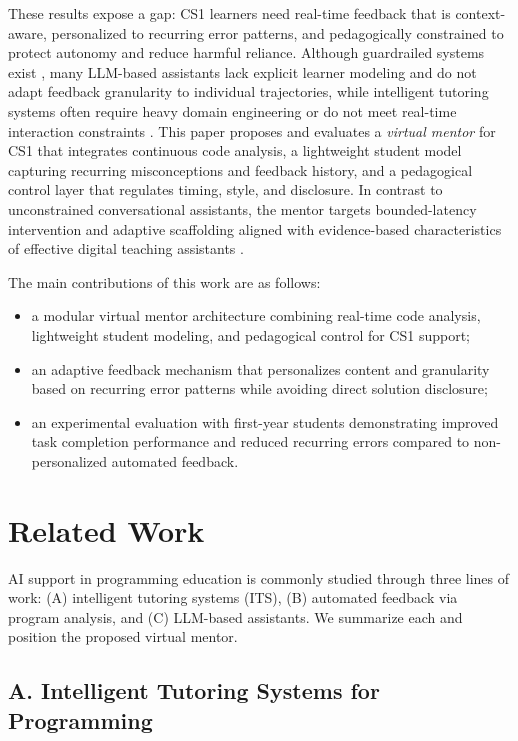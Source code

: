 \documentclass[conference]{IEEEtran}
\begin{document}
These results expose a gap: CS1 learners need real-time feedback that is context-aware, personalized to recurring error patterns, and pedagogically constrained to protect autonomy and reduce harmful reliance. Although guardrailed systems exist \cite{CodeAid,IRIS}, many LLM-based assistants lack explicit learner modeling and do not adapt feedback granularity to individual trajectories, while intelligent tutoring systems often require heavy domain engineering or do not meet real-time interaction constraints \cite{ProgTutor}. This paper proposes and evaluates a \emph{virtual mentor} for CS1 that integrates continuous code analysis, a lightweight student model capturing recurring misconceptions and feedback history, and a pedagogical control layer that regulates timing, style, and disclosure. In contrast to unconstrained conversational assistants, the mentor targets bounded-latency intervention and adaptive scaffolding aligned with evidence-based characteristics of effective digital teaching assistants \cite{DesirableCharacteristicsforAITeachingAssistantsinProgrammingEducation,CodeAid}.

The main contributions of this work are as follows:
\begin{itemize}
\item a modular virtual mentor architecture combining real-time code analysis, lightweight student modeling, and pedagogical control for CS1 support;
\item an adaptive feedback mechanism that personalizes content and granularity based on recurring error patterns while avoiding direct solution disclosure;
\item an experimental evaluation with first-year students demonstrating improved task completion performance and reduced recurring errors compared to non-personalized automated feedback.
\end{itemize}


\section{Related Work}

AI support in programming education is commonly studied through three lines of work: (A) intelligent tutoring systems (ITS), (B) automated feedback via program analysis, and (C) LLM-based assistants. We summarize each and position the proposed virtual mentor.

\subsection*{A. Intelligent Tutoring Systems for Programming}
\end{document}
